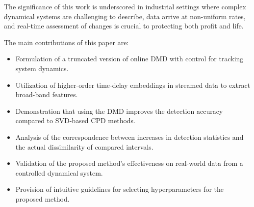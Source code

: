 The significance of this work is underscored in industrial settings where complex dynamical systems are challenging to describe, data arrive at non-uniform rates, and real-time assessment of changes is crucial to protecting both profit and life.

The main contributions of this paper are:
\begin{itemize}
	\item Formulation of a truncated version of online DMD with control for tracking system dynamics.
	\item Utilization of higher-order time-delay embeddings in streamed data to extract broad-band features.
	\item Demonstration that using the DMD improves the detection accuracy compared to SVD-based CPD methods.
	\item Analysis of the correspondence between increases in detection statistics and the actual dissimilarity of compared intervals.
	\item Validation of the proposed method's effectiveness on real-world data from a controlled dynamical system.
	\item Provision of intuitive guidelines for selecting hyperparameters for the proposed method.
\end{itemize}
